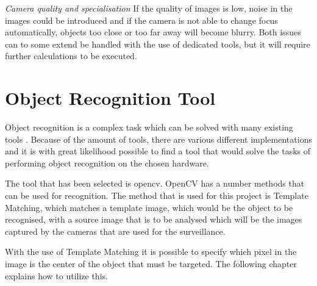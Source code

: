 \emph{Camera quality and specialisation}
If the quality of images is low, noise in the images could be introduced and if the camera is not able to change focus automatically, objects too close or too far away will become blurry. Both issues can to some extend be handled with the use of dedicated tools, but it will require further calculations to be executed.

\section{Object Recognition Tool}\label{sc:ortool}
Object recognition is a complex task which can be solved with many existing tools \citep{cv_tools}. Because of the amount of tools, there are various different implementations and it is with great likelihood possible to find a tool that would solve the tasks of performing object recognition on the chosen hardware.

The tool that has been selected is \gls{opencv}\citep{opencv}. OpenCV has a number methods that can be used for recognition. The method that is used for this project is Template Matching, which matches a template image, which would be the object to be recognised, with a source image that is to be analysed which will be the images captured by the cameras that are used for the surveillance.

With the use of Template Matching it is possible to specify which pixel in the image is the center of the object that must be targeted. The following chapter explains how to utilize this.